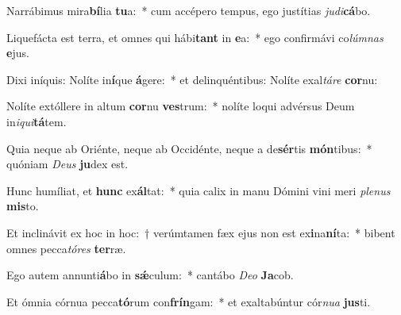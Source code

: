 \item Narrábimus mira\textbf{bí}lia \textbf{tu}a:~* cum accépero tempus, ego justítias \textit{ju}\textit{di}\textbf{cá}bo.
\item Liquefácta est terra, et omnes qui hábi\textbf{tant} in \textbf{e}a:~* ego confirmávi co\textit{lúm}\textit{nas} \textbf{e}jus.
\item Dixi iníquis: Nolíte in\textbf{í}que \textbf{á}gere:~* et delinquéntibus: Nolíte exal\textit{tá}\textit{re} \textbf{cor}nu:
\item Nolíte extóllere in altum \textbf{cor}nu \textbf{ves}trum:~* nolíte loqui advérsus Deum in\textit{i}\textit{qui}\textbf{tá}tem.
\item Quia neque ab Oriénte, neque ab Occidénte, neque a de\textbf{sér}tis \textbf{món}tibus:~* quóniam \textit{De}\textit{us} \textbf{ju}dex est.
\item Hunc humíliat, et \textbf{hunc} ex\textbf{ál}tat:~* quia calix in manu Dómini vini meri \textit{ple}\textit{nus} \textbf{mis}to.
\item Et inclinávit ex hoc in hoc:~† verúmtamen fæx ejus non est ex\textbf{i}na\textbf{ní}ta:~* bibent omnes pecca\textit{tó}\textit{res} \textbf{ter}ræ.
\item Ego autem annunti\textbf{á}bo in \textbf{sǽ}culum:~* cantábo \textit{De}\textit{o} \textbf{Ja}cob.
\item Et ómnia córnua pecca\textbf{tó}rum con\textbf{frín}gam:~* et exaltabúntur cór\textit{nu}\textit{a} \textbf{jus}ti.
